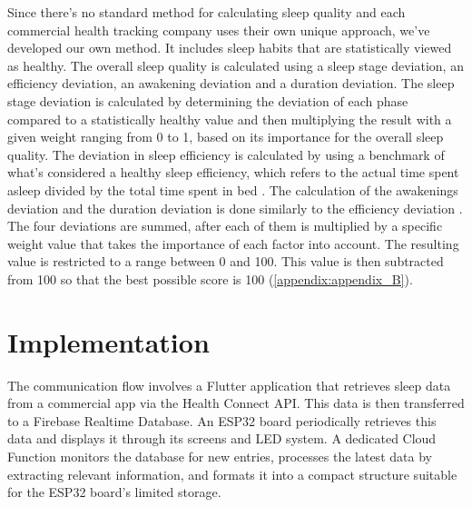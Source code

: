 \documentclass[
  a4paper,  %
  twoside,  %
  bibliography=totoc,
  headsepline,
  cleardoublepage=empty,
  parskip=half,
  draft=false
]{scrbook}
\begin{document}
Since there's no standard method for calculating sleep quality and each commercial health tracking company uses their own unique approach, we've developed our own method. It includes sleep habits that are statistically viewed as healthy.
The overall sleep quality is calculated using a sleep stage deviation, an efficiency deviation, an awakening deviation and a duration deviation. The sleep stage deviation is calculated by determining the deviation of each phase compared to a statistically healthy value \cite{patel_physiology_2023} and then multiplying the result with a given weight ranging from 0 to 1, based on its importance for the overall sleep quality. The deviation in sleep efficiency is calculated by using a benchmark of what's considered a healthy sleep efficiency, which refers to the actual time spent asleep divided by the total time spent in bed \cite{ikeda_relationships_2022, winser_minimum_2013}. The calculation of the awakenings deviation and the duration deviation is done similarly to the efficiency deviation \cite{hirshkowitz_national_2015}. The four deviations are summed, after each of them is multiplied by a specific weight value that takes the importance of each factor into account. The resulting value is restricted to a range between 0 and 100. This value is then subtracted from 100 so that the best possible score is 100 (\autoref{appendix:appendix_B}).

\section{Implementation}

The communication flow involves a Flutter application that retrieves sleep data from a commercial app via the Health Connect API. This data is then transferred to a Firebase Realtime Database. An ESP32 board periodically retrieves this data and displays it through its screens and LED system. A dedicated Cloud Function monitors the database for new entries, processes the latest data by extracting relevant information, and formats it into a compact structure suitable for the ESP32 board's limited storage.
\end{document}
